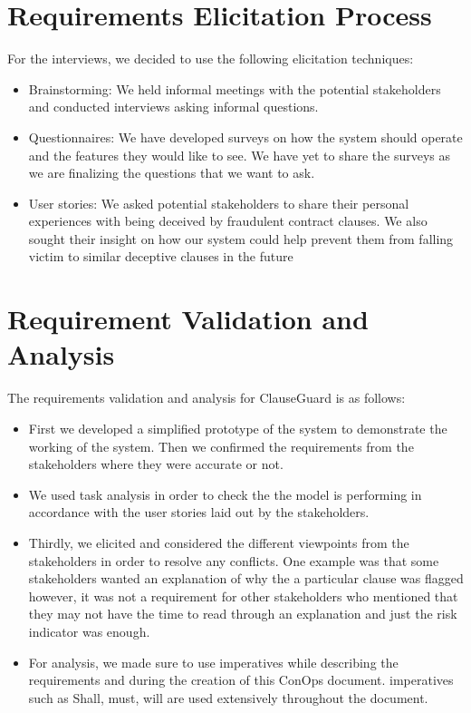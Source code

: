 \begin{itemize}
\begin{itemize}
    \end{itemize}
\end{itemize}



\section{Requirements Elicitation Process \cite{DMuresanReqelicitation}\label{Section::Requirements Elicitation Process} }
For the interviews, we decided to use the following elicitation techniques: 
\begin{itemize}
    \item Brainstorming: We held informal meetings with the potential stakeholders and conducted interviews asking informal questions. 
    \item Questionnaires: We have developed surveys on how the system should operate and the features they would like to see. We have yet to share the surveys as we are finalizing the questions that we want to ask.  
    \item User stories: We asked potential stakeholders to share their personal experiences with being deceived by fraudulent contract clauses. We also sought their insight on how our system could help prevent them from falling victim to similar deceptive clauses in the future
\end{itemize}


\section{ Requirement Validation and Analysis \cite{DMuresanRequirements}\label{Section::Requirement Validation and Analysis} }
The requirements validation and analysis for ClauseGuard is as follows: 
\begin{itemize}
    \item First we developed a simplified prototype of the system to demonstrate the working of the system. Then we confirmed the requirements from the stakeholders where they were accurate or not. 
    \item We used task analysis in order to check the the model is performing in accordance with the user stories laid out by the stakeholders. 
    \item Thirdly, we elicited and considered the different viewpoints from the stakeholders in order to resolve any conflicts. One example was that some stakeholders wanted an explanation of why the a particular clause was flagged however, it was not a requirement for other stakeholders who mentioned that they may not have the time to read through an explanation and just the risk indicator was enough. 
    \item For analysis, we made sure to use imperatives while describing the requirements and during the creation of this ConOps document. imperatives such as Shall, must, will are used extensively throughout the document. 
    \end{itemize}

